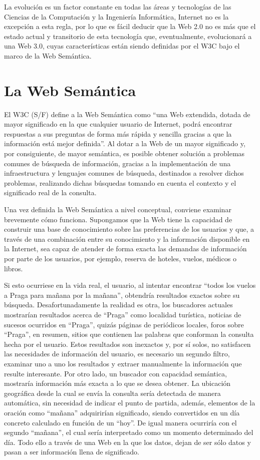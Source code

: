 La evolución es un factor constante en todas las áreas y tecnologías de las Ciencias de la Computación y la Ingeniería Informática, Internet no es la excepción a esta regla, por lo que es fácil deducir que la Web 2.0 no es más que el estado actual y transitorio de esta tecnología que, eventualmente, evolucionará a una Web 3.0, cuyas características están siendo definidas por el W3C bajo el marco de la Web Semántica.

\section{La Web Semántica}

El W3C (S/F) define a la Web Semántica como ``una Web extendida, dotada de mayor significado en la que cualquier usuario de Internet, podrá encontrar respuestas a sus preguntas de forma más rápida y sencilla gracias a que la información está mejor definida''. Al dotar a la Web de un mayor significado y, por consiguiente, de mayor semántica, es posible obtener solución a problemas comunes de búsqueda de información, gracias a la implementación de una infraestructura y lenguajes comunes de búsqueda, destinados a resolver dichos problemas, realizando dichas búsquedas tomando en cuenta el contexto y el significado real de la consulta.

Una vez definida la Web Semántica a nivel conceptual, conviene examinar brevemente cómo funciona. Supongamos que la Web tiene la capacidad de construir una base de conocimiento sobre las preferencias de los usuarios y que, a través de una combinación entre su conocimiento y la información disponible en la Internet, sea capaz de atender de forma exacta las demandas de información por parte de los usuarios, por ejemplo, reserva de hoteles, vuelos, médicos o libros.

Si esto ocurriese en la vida real, el usuario, al intentar encontrar ``todos los vuelos a Praga para mañana por la mañana'', obtendría resultados exactos sobre su búsqueda. Desafortunadamente la realidad es otra, los buscadores actuales mostrarían resultados acerca de ``Praga'' como localidad turística, noticias de sucesos ocurridos en ``Praga'', quizás páginas de periódicos locales, foros sobre ``Praga'', en resumen, sitios que contienen las palabras que conforman la consulta hecha por el usuario. Estos resultados son inexactos y, por sí solos, no satisfacen las necesidades de información del usuario, es necesario un segundo filtro, examinar uno a uno los resultados y extraer manualmente la información que resulte interesante. Por otro lado, un buscador con capacidad semántica, mostraría información más exacta a lo que se desea obtener. La ubicación geográfica desde la cual se envía la consulta sería detectada de manera automática, sin necesidad de indicar el punto de partida, además, elementos de la oración como ``mañana'' adquirirían significado, siendo convertidos en un día concreto calculado en función de un ``hoy''. De igual manera ocurriría con el segundo ``mañana'', el cual sería interpretado como un momento determinado del día. Todo ello a través de una Web en la que los datos, dejan de ser sólo datos y pasan a ser información llena de significado.

